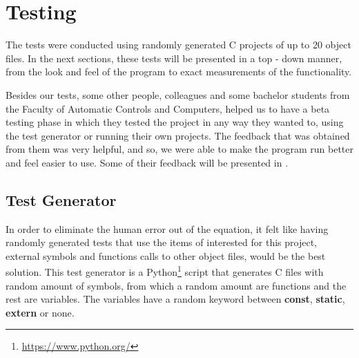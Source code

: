 
\chapter{Testing}
\label{chapter:testing}


The tests were conducted using randomly generated C projects of up to 20 object files. In the next sections, these tests will be presented in a top -{} down manner, from the look and feel of the program to exact measurements of the functionality.

Besides our tests, some other people, colleagues and some bachelor students from the Faculty of Automatic Controls and Computers, helped us to have a beta testing phase in which they tested the project in any way they wanted to, using the test generator or running their own projects. The feedback that was obtained from them was very helpful, and so, we were able to make the program run better and feel easier to use. Some of their feedback will be presented in .

\section{Test Generator}
\label{sec:test-gen}

In order to eliminate the human error out of the equation, it felt like having randomly generated tests that use the items of interested for this project, external symbols and functions calls to other object files, would be the best solution. This test generator is a Python\footnote{\url{https://www.python.org/}} script that generates C files with random amount of symbols, from which a random amount are functions and the rest are variables. The variables have a random keyword between \textbf{const}, \textbf{static}, \textbf{extern} or none.

